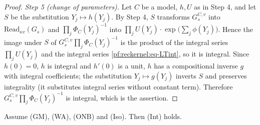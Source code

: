 \begin{proof}
\emph{Step 5 (change of parameters).} Let $C$ be a model, $h,U$ as in Step 4, and let $S$ be the substitution
$Y_j\mapsto h(Y_j)$. By Step 4, $S$ transforms $G_s^{C,v}$ into $\mathrm{Read}_{\kappa v}(G_s)$ and
$\prod_j\Phi_C(Y_j)^{-1}$ into $\prod_jU(Y_j)\cdot\exp\bigl(\sum_j\phi(Y_j)\bigr)$. Hence the image under $S$ of
$G_s^{C,v}\prod_j\Phi_C(Y_j)^{-1}$ is the product of the integral series $\prod_jU(Y_j)$ and the integral series
\eqref{pf:reckernel:eq-LTint}, so it is integral. Since $h(0)=0$, $h$ is integral and $h'(0)$ is a unit, $h$ has a
compositional inverse $g$ with integral coefficients; the substitution $Y_j\mapsto g(Y_j)$ inverts $S$ and preserves
integrality (it substitutes integral series without constant term). Therefore
$G_s^{C,v}\prod_j\Phi_C(Y_j)^{-1}$ is integral, which is the assertion.
\end{proof}

\begin{theorem}\label{pf:reckernel:intRed}
Assume \textup{(GM)}, \textup{(WA)}, \textup{(ONB)} and \textup{(Iso)}. Then \textup{(Int)} holds.
\end{theorem}


